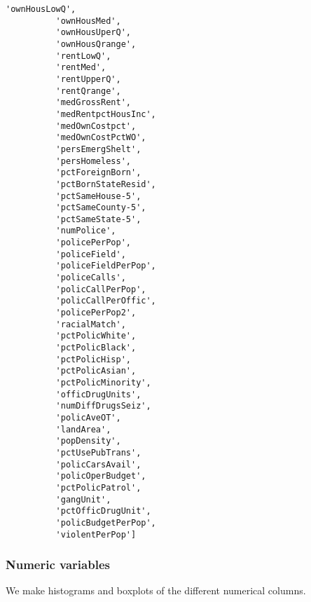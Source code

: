 \documentclass[11pt]{llncs}
\begin{document}
\begin{Verbatim}[commandchars=\\\{\}]
          'ownHousLowQ',
          'ownHousMed',
          'ownHousUperQ',
          'ownHousQrange',
          'rentLowQ',
          'rentMed',
          'rentUpperQ',
          'rentQrange',
          'medGrossRent',
          'medRentpctHousInc',
          'medOwnCostpct',
          'medOwnCostPctWO',
          'persEmergShelt',
          'persHomeless',
          'pctForeignBorn',
          'pctBornStateResid',
          'pctSameHouse-5',
          'pctSameCounty-5',
          'pctSameState-5',
          'numPolice',
          'policePerPop',
          'policeField',
          'policeFieldPerPop',
          'policeCalls',
          'policCallPerPop',
          'policCallPerOffic',
          'policePerPop2',
          'racialMatch',
          'pctPolicWhite',
          'pctPolicBlack',
          'pctPolicHisp',
          'pctPolicAsian',
          'pctPolicMinority',
          'officDrugUnits',
          'numDiffDrugsSeiz',
          'policAveOT',
          'landArea',
          'popDensity',
          'pctUsePubTrans',
          'policCarsAvail',
          'policOperBudget',
          'pctPolicPatrol',
          'gangUnit',
          'pctOfficDrugUnit',
          'policBudgetPerPop',
          'violentPerPop']
\end{Verbatim}
            
    \subsubsection{Numeric variables}\label{numeric-variables}

    We make histograms and boxplots of the different numerical columns.
\end{document}
